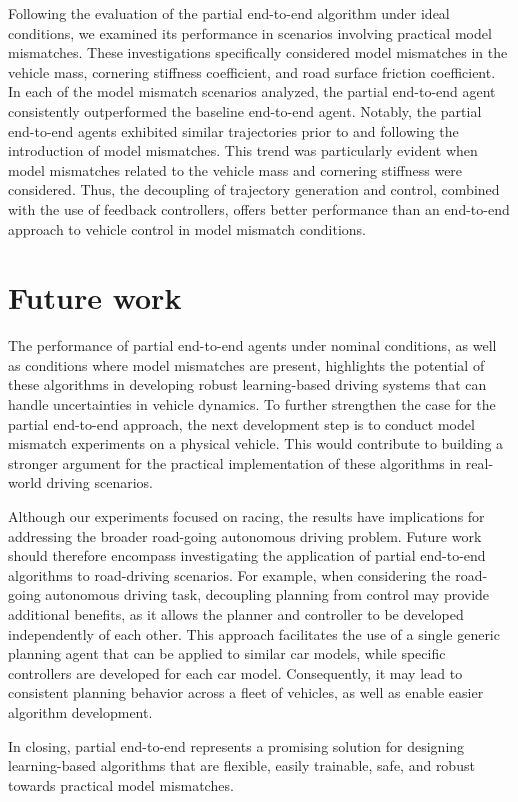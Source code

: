 Following the evaluation of the partial end-to-end algorithm under ideal conditions, we examined its performance in scenarios involving practical model mismatches. 
These investigations specifically considered model mismatches in the vehicle mass, cornering stiffness coefficient, and road surface friction coefficient.
In each of the model mismatch scenarios analyzed, the partial end-to-end agent consistently outperformed the baseline end-to-end agent. 
Notably, the partial end-to-end agents exhibited similar trajectories prior to and following the introduction of model mismatches. 
This trend was particularly evident when model mismatches related to the vehicle mass and cornering stiffness were considered.
Thus, the decoupling of trajectory generation and control, combined with the use of feedback controllers, offers better performance than an end-to-end approach to vehicle control in model mismatch conditions.



\section{Future work}

The performance of partial end-to-end agents under nominal conditions, as well as conditions where model mismatches are present, highlights the potential of these algorithms in developing robust learning-based driving systems that can handle uncertainties in vehicle dynamics.
To further strengthen the case for the partial end-to-end approach, the next development step is to conduct model mismatch experiments on a physical vehicle.
This would contribute to building a stronger argument for the practical implementation of these algorithms in real-world driving scenarios.


Although our experiments focused on racing, the results have implications for addressing the broader road-going autonomous driving problem.
Future work should therefore encompass investigating the application of partial end-to-end algorithms to road-driving scenarios.
For example, when considering the road-going autonomous driving task, decoupling planning from control may provide additional benefits, as it allows the planner and controller to be developed independently of each other.
This approach facilitates the use of a single generic planning agent that can be applied to similar car models, while specific controllers are developed for each car model.
Consequently, it may lead to consistent planning behavior across a fleet of vehicles, as well as enable easier algorithm development.

In closing, partial end-to-end represents a promising solution for designing learning-based algorithms that are flexible, easily trainable, safe, and robust towards practical model mismatches.



